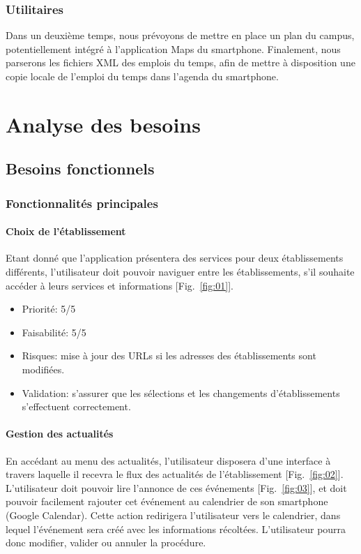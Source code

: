 \documentclass [pdftex,12pt] {report}
\begin{document}
\subsection{Utilitaires}
Dans un deuxième temps, nous prévoyons de mettre en place un plan du campus, potentiellement intégré à l'application Maps du smartphone.
Finalement, nous parserons les fichiers XML des emplois du temps\cite{EdTxml}, afin de mettre à disposition une copie locale de l'emploi du temps dans l'agenda du smartphone.


\chapter{Analyse des besoins}

\section{Besoins fonctionnels}
\subsection{Fonctionnalités principales}
\subsubsection{Choix de l'établissement}
Etant donné que l'application présentera des services pour deux établissements différents, l'utilisateur doit pouvoir naviguer entre les établissements, s'il souhaite accéder à leurs services et informations [Fig.~\ref{fig:01}]. \\

\begin{itemize}
\renewcommand{\labelitemi}{$\bullet$}
\item Priorité: 5/5
\item Faisabilité: 5/5
\item Risques: mise à jour des URLs si les adresses des établissements sont modifiées.
\item Validation: s'assurer que les sélections et les changements d'établissements s'effectuent correctement.
\end{itemize}

\subsubsection{Gestion des actualités}
En accédant au menu des actualités, l'utilisateur disposera d'une interface à travers laquelle il recevra le flux des actualités de l'établissement [Fig.~\ref{fig:02}]. L'utilisateur doit pouvoir lire l'annonce de ces événements [Fig.~\ref{fig:03}], et doit pouvoir facilement rajouter cet événement au calendrier de son smartphone (Google Calendar). Cette action redirigera l'utilisateur vers le calendrier, dans lequel l'événement sera créé avec les informations récoltées. L'utilisateur pourra donc modifier, valider ou annuler la procédure. \\
\end{document}
